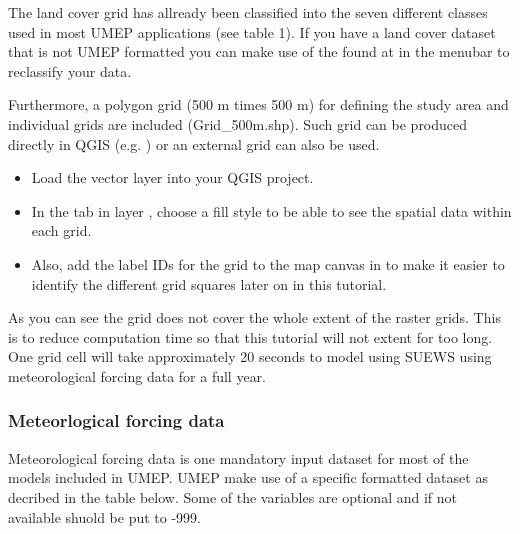 \documentclass[letterpaper,10pt,english]{sphinxmanual}
\begin{document}
The land cover grid has allready been classified into the seven different classes used in most UMEP applications (see table 1). If you have a land cover dataset that is not UMEP formatted you can make use of the  found at  in the menubar to reclassify your data.

Furthermore, a polygon grid (500 m times 500 m) for defining the study area and individual grids are included (Grid\_500m.shp). Such grid can be produced directly in QGIS (e.g. ) or an external grid can also be used.
\begin{itemize}
\item {} 
Load the vector layer  into your QGIS project.

\item {} 
In the  tab in layer , choose a  fill style to be able to see the spatial data within each grid.

\item {} 
Also, add the label IDs for the grid to the map canvas in  to make it easier to identify the different grid squares later on in this tutorial.

\end{itemize}

As you can see the grid does not cover the whole extent of the raster grids. This is to reduce computation time so that this tutorial will not extent for too long. One grid cell will take approximately 20 seconds to model using SUEWS using meteorological forcing data for a full year.


\subsubsection{Meteorlogical forcing data}
\label{\detokenize{Tutorials/SuewsSpatial:meteorlogical-forcing-data}}
Meteorological forcing data is one mandatory input dataset for most of the models included in UMEP. UMEP make use of a specific formatted dataset as decribed in the table below. Some of the variables are optional and if not available shuold be put to -999.
\end{document}
